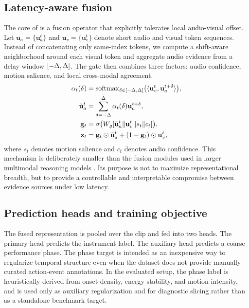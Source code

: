 \subsection{Latency-aware fusion}

The core of \method is a fusion operator that explicitly tolerates local audio-visual offset. Let $\mathbf{u}_a = \{\mathbf{u}_a^t\}$ and $\mathbf{u}_v = \{\mathbf{u}_v^t\}$ denote short audio and visual token sequences. Instead of concatenating only same-index tokens, we compute a shift-aware neighborhood around each visual token and aggregate audio evidence from a delay window $[-\Delta,\Delta]$. The gate then combines three factors: audio confidence, motion salience, and local cross-modal agreement.
\begin{align}
\alpha_t(\delta) &= \mathrm{softmax}_{\delta \in [-\Delta,\Delta]} \bigl(\langle \mathbf{u}_v^t, \mathbf{u}_a^{t+\delta} \rangle \bigr), \\
\tilde{\mathbf{u}}_a^t &= \sum_{\delta=-\Delta}^{\Delta} \alpha_t(\delta) \mathbf{u}_a^{t+\delta}, \\
\mathbf{g}_t &= \sigma \bigl( W_g [\tilde{\mathbf{u}}_a^t \| \mathbf{u}_v^t \| s_t \| c_t] \bigr), \\
\mathbf{z}_t &= \mathbf{g}_t \odot \tilde{\mathbf{u}}_a^t + (1-\mathbf{g}_t) \odot \mathbf{u}_v^t,
\end{align}
where $s_t$ denotes motion salience and $c_t$ denotes audio confidence. This mechanism is deliberately smaller than the fusion modules used in larger multimodal reasoning models \citep{Mao2025DeepResonance,Chen2025MusiXQA}. Its purpose is not to maximize representational breadth, but to provide a controllable and interpretable compromise between evidence sources under low latency.

\subsection{Prediction heads and training objective}

The fused representation is pooled over the clip and fed into two heads. The primary head predicts the instrument label. The auxiliary head predicts a coarse performance phase. The phase target is intended as an inexpensive way to regularize temporal structure even when the dataset does not provide manually curated action-event annotations. In the evaluated setup, the phase label is heuristically derived from onset density, energy stability, and motion intensity, and is used only as auxiliary regularization and for diagnostic slicing rather than as a standalone benchmark target.

